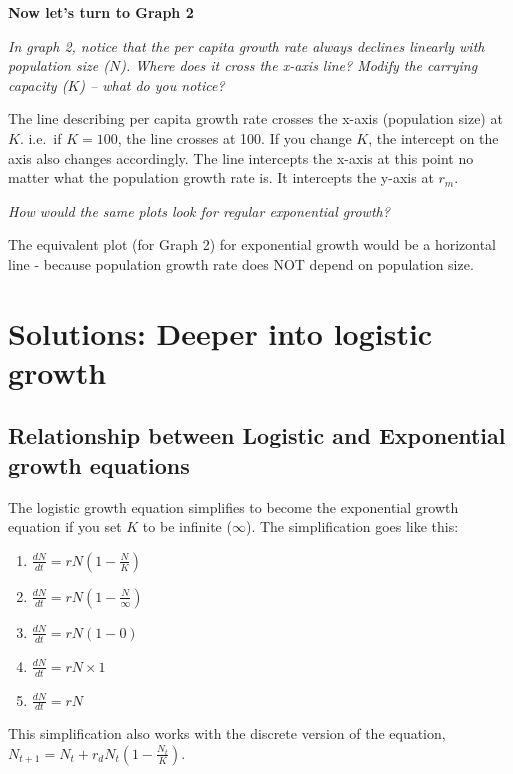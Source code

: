\documentclass[
  a4paper]{book}
\providecommand{\tightlist}{%
  \setlength{\itemsep}{0pt}\setlength{\parskip}{0pt}}
\begin{document}
\textbf{Now let's turn to Graph 2}

\emph{In graph 2, notice that the per capita growth rate always declines linearly with population size (\(N\)). Where does it cross the x-axis line? Modify the carrying capacity (\(K\)) -- what do you notice?}

The line describing per capita growth rate crosses the x-axis (population size) at \(K\). i.e.~if \(K = 100\), the line crosses at 100. If you change \(K\), the intercept on the axis also changes accordingly. The line intercepts the x-axis at this point no matter what the population growth rate is. It intercepts the y-axis at \(r_m\).

\emph{How would the same plots look for regular exponential growth?}

The equivalent plot (for Graph 2) for exponential growth would be a horizontal line - because population growth rate does NOT depend on population size.

\section{Solutions: Deeper into logistic growth}\label{solutions-deeper-into-logistic-growth}

\subsection{Relationship between Logistic and Exponential growth equations}\label{relationship-between-logistic-and-exponential-growth-equations}

The logistic growth equation simplifies to become the exponential growth equation if you set \(K\) to be infinite (\(\infty\)). The simplification goes like this:

\begin{enumerate}
\def\labelenumi{\arabic{enumi}.}
\tightlist
\item
  \(\frac{d N}{d t}=r N\left(1-\frac{N}{K}\right)\)
\item
  \(\frac{d N}{d t}=r N\left(1-\frac{N}{\infty}\right)\)
\item
  \(\frac{d N}{d t}=r N\left(1-0\right)\)
\item
  \(\frac{d N}{d t}=r N \times 1\)
\item
  \(\frac{d N}{d t}=r N\)
\end{enumerate}

This simplification also works with the discrete version of the equation, \(N_{t+1}=N_{t}+r_{d} N_{t}\left(1-\frac{N_{t}}{K}\right)\).
\end{document}
